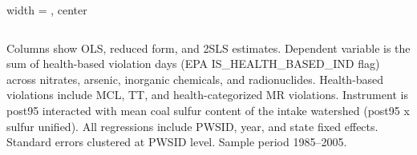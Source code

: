 \begin{table}[htbp]
\begin{adjustbox}{width = \textwidth, center}
\begin{tabular}{lccc}
         \bottomrule
         
      \end{tabular}
      
      
      
   \end{adjustbox}
      {\tiny\linespread{1}\selectfont \par \raggedright 
   Columns show OLS, reduced form, and 2SLS estimates. Dependent variable is the sum of health-based violation days (EPA IS\_HEALTH\_BASED\_IND flag) across nitrates, arsenic, inorganic chemicals, and radionuclides. Health-based violations include MCL, TT, and health-categorized MR violations. Instrument is post95 interacted with mean coal sulfur content of the intake watershed (post95 x sulfur unified). All regressions include PWSID, year, and state fixed effects. Standard errors clustered at PWSID level. Sample period 1985--2005.}
   
\end{table}


